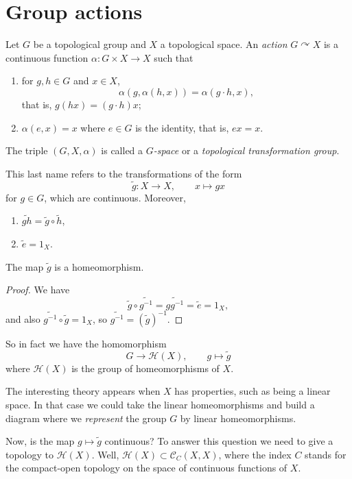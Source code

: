 \section{Group actions}
\label{section-group-actions}

\begin{definition}
\label{definition-action}
Let $G$ be a topological group and $X$
a topological space. An {\it action}
$G\curvearrowright X$ is a continuous
function $\alpha:G\times X\to X$ such
that
\begin{enumerate}
\item for $g,h\in G$ and $x\in X$,
$$
\alpha(g,\alpha(h,x))
=\alpha(g\cdot h,x),
$$
that is, $g(hx)=(g\cdot h)x$;
\item $\alpha(e,x)=x$ where $e\in G$ is
the identity, that is, $ex=x$.
\end{enumerate}
The triple $(G,X,\alpha)$ is called a
{\it $G$-space} or a
{\it topological transformation group}.
\end{definition}

This last name refers to the
transformations of the form
$$
\tilde{g}:X\to X,
\qquad
x\mapsto gx
$$
for $g\in G$, which are continuous.
Moreover,
\begin{enumerate}
\item $\widetilde{gh}
=\tilde{g}\circ\tilde{h}$,
\item $\tilde{e}=1_X$.
\end{enumerate}

\begin{proposition}
\label{proposition-translation-homeomorphism}
The map $\tilde{g}$ is a homeomorphism.
\end{proposition}

\begin{proof}
We have
$$
\tilde{g}\circ\widetilde{g^{-1}}
=\widetilde{gg^{-1}}
=\tilde{e}=1_X,
$$
and also
$\widetilde{g^{-1}}\circ\tilde{g}=1_X$,
so
$\widetilde{g^{-1}}=(\tilde{g})^{-1}$.
\end{proof}

So in fact we have the homomorphism
$$
G\to\mathcal{H}(X),
\qquad
g\mapsto\tilde{g}
$$
where $\mathcal{H}(X)$ is the group of
homeomorphisms of $X$.

The interesting theory appears when $X$
has properties, such as being a linear
space. In that case we could take the
linear homeomorphisms and build a
diagram where we {\it represent} the
group $G$ by linear homeomorphisms.

Now, is the map $g\mapsto\tilde{g}$
continuous? To answer this question we
need to give a topology to
$\mathcal{H}(X)$. Well,
$\mathcal{H}(X)
\subset\mathcal{C}_C(X,X)$, where the
index $C$ stands for the compact-open
topology on the space of continuous
functions of $X$.

